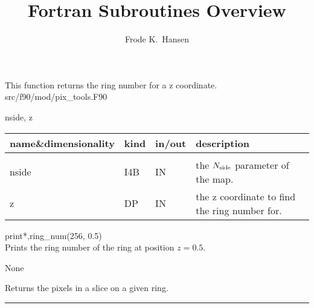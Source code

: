 

\sloppy

\title{\healpix Fortran Subroutines Overview}
 \section[ring\_num]{ }
\label{sub:ring_num}
\author{Frode K.~Hansen}


\begin{facility}
{This function returns the ring number for a z coordinate.}
{src/f90/mod/pix\_tools.F90}
\end{facility}

\begin{f90function}
{nside, z}
\end{f90function}

\begin{arguments}
{
\begin{tabular}{p{0.4\hsize} p{0.05\hsize} p{0.1\hsize} p{0.35\hsize}} \hline  
\textbf{name\&dimensionality} & \textbf{kind} & \textbf{in/out} & \textbf{description} \\ \hline
                   &   &   &                           \\ %
nside & I4B & IN & the ${N_{\rm side}}$ parameter of the map. \\
z & DP & IN & the z coordinate to find the ring number for. \\

\end{tabular}
}
\end{arguments}

\begin{example}
{
print*,ring\_num(256, 0.5)  \\
}
{
Prints the ring number of the ring at position $z=0.5$.
}
\end{example}

\begin{modules}
  \begin{sulist}{} %
 \item[None]	
  \end{sulist}
\end{modules}
\newpage
\begin{related}
  \begin{sulist}{} %
 \item[\htmlref{in\_ring}{sub:in_ring}] Returns the pixels in a slice on a given ring.
  \end{sulist}
\end{related}

\rule{\hsize}{2mm}

\newpage
